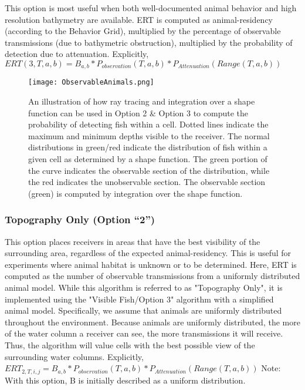 This option is most useful when both well-documented animal behavior and high resolution bathymetry are available.  ERT is computed as animal-residency (according to the Behavior Grid), multiplied by the percentage of observable transmissions (due to bathymetric obstruction), multiplied by the probability of detection due to attenuation.  \newline
Explicitly,
$ERT(3,T,a,b) =  B_{a,b} * P_{observation}(T,a,b) * P_{Attenuation}(Range(T,a,b))$

\begin{figure}[ht]
	\centering
	\texttt{[image: ObservableAnimals.png]}
	\caption{An illustration of how ray tracing and integration over a shape function can be used in Option 2 \& Option 3 to compute the probability of detecting fish within a cell.  Dotted lines indicate the maximum and minimum depths visible to the receiver.  The normal distributions in green/red indicate the distribution of fish within a given cell as determined by a shape function.  The green portion of the curve indicates the observable section of the distribution, while the red indicates the unobservable section.  The observable section (green) is computed by integration over the shape function.
		\label{observableAnimals}}
\end{figure}

\subsubsection{Topography Only (Option “2”)}
\label{bias2}
This option places receivers in areas that have the best visibility of the surrounding area, regardless of the expected animal-residency.  This is useful for experiments where animal habitat is unknown or to be determined.  Here, ERT is computed as the number of observable transmissions from a uniformly distributed animal model.  While this algorithm is referred to as "Topography Only", it is implemented using the "Visible Fish/Option 3" algorithm with a simplified animal model.  Specifically, we assume that animals are uniformly distributed throughout the environment.  Because animals are uniformly distributed, the more of the water column a receiver can see, the more transmissions it will receive.  Thus, the algorithm will value cells with the best possible view of the surrounding water columns.\newline
Explicitly,
$ERT_{2,T,i,j} =  B_{a,b} * P_{observation}(T,a,b) * P_{Attenuation}(Range(T,a,b))$\newline
Note: With this option, B is initially described as a uniform distribution.


